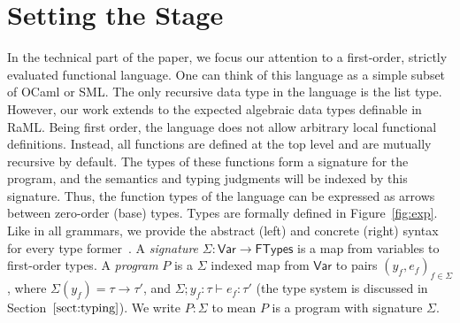 \documentclass{easychair}
\newcommand{\ms}[1]{\ensuremath{\mathsf{#1}}}
\theoremstyle{definition}
\begin{document}
\section{Setting the Stage}
\label{sect:fop}

In the technical part of the paper, we focus our attention to a first-order, 
strictly evaluated functional language. 
One can think of this language as a simple subset of OCaml or SML. 
The only recursive data type in the language is the list type. 
However, our work extends to the expected algebraic data types definable in RaML.
Being first order, the language does not allow arbitrary local functional definitions. Instead,
all functions are defined at the top level and are mutually recursive by default.
The types of these functions form a signature for the program, and the semantics and typing 
judgments will be indexed by this signature.
Thus, the function types of the language can be expressed 
as arrows between zero-order (base)  types. 
%
Types are formally defined in Figure~\ref{fig:exp}. Like in all
grammars, we provide the abstract (left) and concrete (right) syntax
for every type former~\cite{PFPL16}.
A \emph{signature}  $\Sigma : \ms{Var} \to \ms{FTypes}$ is a map from variables to 
first-order types. 
A \emph{program} $P$ is a $\Sigma$ indexed map from $\ms{Var}$ to pairs 
$(y_f,e_f)_{f \in \Sigma}$, where $\Sigma(y_f) = \tau \to \tau'$, 
and $\Sigma;y_f : \tau \vdash e_f : \tau'$ (the type system is discussed in Section~$\ref{sect:typing}$). 
We write $P : \Sigma$ to mean $P$ is a program with signature $\Sigma$. 
\end{document}
